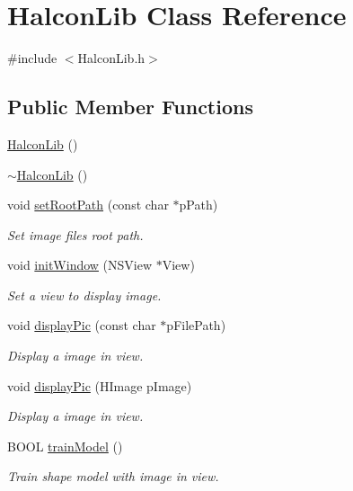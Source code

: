 \hypertarget{class_halcon_lib}{}\section{Halcon\+Lib Class Reference}
\label{class_halcon_lib}


{\ttfamily \#include $<$Halcon\+Lib.\+h$>$}

\subsection*{Public Member Functions}
\begin{DoxyCompactItemize}
\item 
\hyperlink{class_halcon_lib_a8154f7bdc3f6fbb7acc6bfef2662bd7c}{Halcon\+Lib} ()
\item 
\hyperlink{class_halcon_lib_a75847d7a43923b3bcb6944fe78a6e880}{$\sim$\+Halcon\+Lib} ()
\item 
void \hyperlink{class_halcon_lib_a7880d9c4e9c78110e05f84c114b213d7}{set\+Root\+Path} (const char $\ast$p\+Path)
\begin{DoxyCompactList}\small\item\em Set image files root path. \end{DoxyCompactList}\item 
void \hyperlink{class_halcon_lib_a7b05ea88cb64ed04e198e24e058adaa9}{init\+Window} (N\+S\+View $\ast$View)
\begin{DoxyCompactList}\small\item\em Set a view to display image. \end{DoxyCompactList}\item 
void \hyperlink{class_halcon_lib_af4c7b850657286f3eb11a45b87ac9f3d}{display\+Pic} (const char $\ast$p\+File\+Path)
\begin{DoxyCompactList}\small\item\em Display a image in view. \end{DoxyCompactList}\item 
void \hyperlink{class_halcon_lib_a4488149174812b1ad97739c7415d087b}{display\+Pic} (H\+Image p\+Image)
\begin{DoxyCompactList}\small\item\em Display a image in view. \end{DoxyCompactList}\item 
B\+O\+OL \hyperlink{class_halcon_lib_adf353278dfe0866e55a73db505d09a84}{train\+Model} ()
\begin{DoxyCompactList}\small\item\em Train shape model with image in view. \end{DoxyCompactList}\item 

\end{DoxyCompactItemize}

